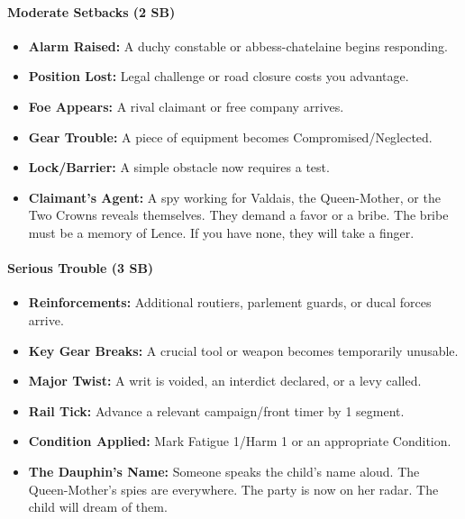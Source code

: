\paragraph{Moderate Setbacks (2 SB)}
\begin{itemize}
\item \textbf{Alarm Raised:} A duchy constable or abbess-chatelaine begins responding.
\item \textbf{Position Lost:} Legal challenge or road closure costs you advantage.
\item \textbf{Foe Appears:} A rival claimant or free company arrives.
\item \textbf{Gear Trouble:} A piece of equipment becomes Compromised/Neglected.
\item \textbf{Lock/Barrier:} A simple obstacle now requires a test.
\item \textbf{Claimant's Agent:} A spy working for Valdais, the Queen-Mother, or the Two Crowns reveals themselves. They demand a favor or a bribe. The bribe must be a memory of Lence. If you have none, they will take a finger.
\end{itemize}

\paragraph{Serious Trouble (3 SB)}
\begin{itemize}
\item \textbf{Reinforcements:} Additional routiers, parlement guards, or ducal forces arrive.
\item \textbf{Key Gear Breaks:} A crucial tool or weapon becomes temporarily unusable.
\item \textbf{Major Twist:} A writ is voided, an interdict declared, or a levy called.
\item \textbf{Rail Tick:} Advance a relevant campaign/front timer by 1 segment.
\item \textbf{Condition Applied:} Mark Fatigue 1/Harm 1 or an appropriate Condition.
\item \textbf{The Dauphin's Name:} Someone speaks the child's name aloud. The Queen-Mother's spies are everywhere. The party is now on her radar. The child will dream of them.
\end{itemize}

